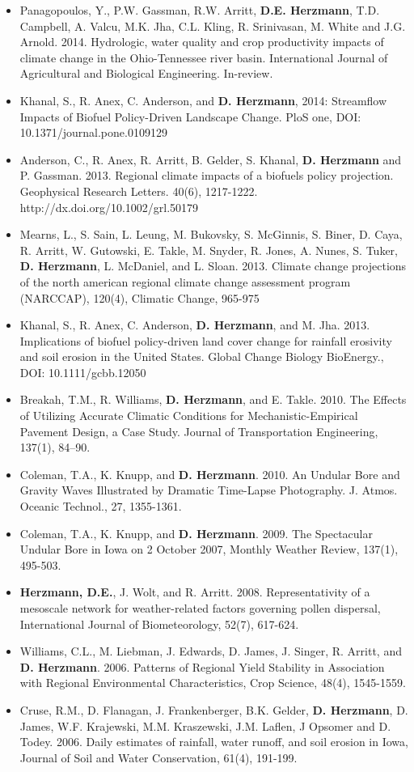 \begin{itemize}
\item Panagopoulos, Y., P.W. Gassman, R.W. Arritt, \textbf{D.E. Herzmann}, T.D. Campbell, A. Valcu, M.K. Jha, C.L. Kling, R. Srinivasan, M. White and J.G. Arnold. 2014. Hydrologic, water quality and crop productivity impacts of climate change in the Ohio-Tennessee river basin. International Journal of Agricultural and Biological Engineering. In-review.
\item Khanal, S., R. Anex, C. Anderson, and \textbf{D. Herzmann}, 2014: Streamflow Impacts of Biofuel Policy-Driven Landscape Change. PloS one, DOI: 10.1371/journal.pone.0109129
\item Anderson, C., R. Anex, R. Arritt, B. Gelder, S. Khanal, \textbf{D. Herzmann} and P. Gassman. 2013. Regional climate impacts of a biofuels policy projection. Geophysical Research Letters. 40(6), 1217-1222. http://dx.doi.org/10.1002/grl.50179
\item Mearns, L., S. Sain, L. Leung, M. Bukovsky, S. McGinnis, S. Biner, D. Caya, R. Arritt, W. Gutowski, E. Takle, M. Snyder, R. Jones, A. Nunes, S. Tuker, \textbf{D. Herzmann}, L. McDaniel, and L. Sloan. 2013. Climate change projections of the north american regional climate change assessment program (NARCCAP), 120(4), Climatic Change, 965-975
\item Khanal, S., R. Anex, C. Anderson, \textbf{D. Herzmann}, and M. Jha. 2013. Implications of biofuel policy-driven land cover change for rainfall erosivity and soil erosion in the United States. Global Change Biology BioEnergy., DOI: 10.1111/gcbb.12050
\item Breakah, T.M., R. Williams, \textbf{D. Herzmann}, and E. Takle. 2010. The Effects of Utilizing Accurate Climatic Conditions for Mechanistic-Empirical Pavement Design, a Case Study. Journal of Transportation Engineering, 137(1), 84–90.
\item Coleman, T.A., K. Knupp, and \textbf{D. Herzmann}. 2010. An Undular Bore and Gravity Waves Illustrated by Dramatic Time-Lapse Photography. J. Atmos. Oceanic Technol., 27, 1355-1361.
\item Coleman, T.A., K. Knupp, and \textbf{D. Herzmann}. 2009. The Spectacular Undular Bore in Iowa on 2 October 2007, Monthly Weather Review, 137(1), 495-503.
\item \textbf{Herzmann, D.E.}, J. Wolt, and R. Arritt. 2008. Representativity of a mesoscale network for weather-related factors governing pollen dispersal, International Journal of Biometeorology, 52(7), 617-624.
\item Williams, C.L., M. Liebman, J. Edwards, D. James, J. Singer, R. Arritt, and \textbf{D. Herzmann}. 2006. Patterns of Regional Yield Stability in Association with Regional Environmental Characteristics, Crop Science, 48(4), 1545-1559.
\item Cruse, R.M., D. Flanagan, J. Frankenberger, B.K. Gelder, \textbf{D. Herzmann}, D. James, W.F. Krajewski, M.M. Kraszewski, J.M. Laflen, J Opsomer and D. Todey. 2006. Daily estimates of rainfall, water runoff, and soil erosion in Iowa, Journal of Soil and Water Conservation, 61(4), 191-199.
\end{itemize}

